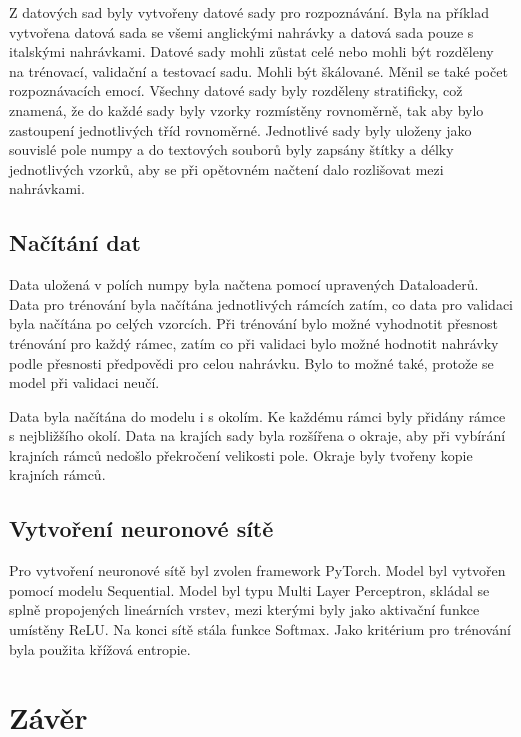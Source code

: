 \documentclass[FM,BP]{tulthesis}
\begin{document}
Z datových sad byly vytvořeny datové sady pro rozpoznávání. Byla na příklad vytvořena datová sada se všemi anglickými nahrávky a datová sada pouze s italskými nahrávkami. Datové sady mohli zůstat celé nebo mohli být rozděleny na trénovací, validační a testovací sadu. Mohli být škálované. Měnil se také počet rozpoznávacích emocí. Všechny datové sady byly rozděleny stratificky, což znamená, že do každé sady byly vzorky rozmístěny rovnoměrně, tak aby bylo zastoupení jednotlivých tříd rovnoměrné. Jednotlivé sady byly uloženy jako souvislé pole numpy a do textových souborů byly zapsány štítky a délky jednotlivých vzorků, aby se při opětovném načtení dalo rozlišovat mezi nahrávkami.

\section{Načítání dat}
Data uložená v polích numpy byla načtena pomocí upravených Dataloaderů. Data pro trénování byla načítána jednotlivých rámcích zatím, co data pro validaci byla načítána po celých vzorcích. Při trénování bylo možné vyhodnotit přesnost trénování pro každý rámec, zatím co při validaci bylo možné hodnotit nahrávky podle přesnosti předpovědi pro celou nahrávku. Bylo to možné také, protože se model při validaci neučí.

Data byla načítána do modelu i s okolím. Ke každému rámci byly přidány rámce s nejbližšího okolí. Data na krajích sady byla rozšířena o okraje, aby při vybírání krajních rámců nedošlo překročení velikosti pole. Okraje byly tvořeny kopie krajních rámců.

\section{Vytvoření neuronové sítě}
Pro vytvoření neuronové sítě byl zvolen framework PyTorch. Model byl vytvořen pomocí modelu Sequential. Model byl typu Multi Layer Perceptron, skládal se splně propojených lineárních vrstev, mezi kterými byly jako aktivační funkce umístěny ReLU. Na konci sítě stála funkce Softmax. Jako kritérium pro trénování byla použita křížová entropie.

\chapter{Závěr}

\nocite{*}
\printbibliography[title={Použitá literatura}] %
\end{document}
